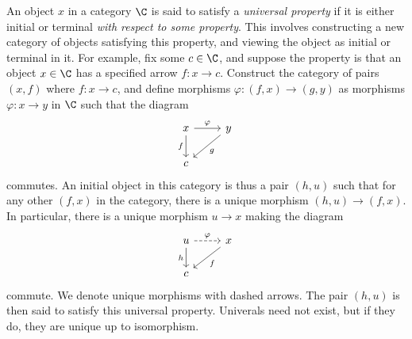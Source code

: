 \begin{terminology}\label{A.2.5}
    An object $x$ in a category $\C$ is said to satisfy a \emph{universal property} if it is either initial or terminal \emph{with respect to some property}. This involves constructing a new category of objects satisfying this property, and viewing the object as initial or terminal in it. For example, fix some $c\in\C$, and suppose the property is that an object $x\in\C$ has a specified arrow $f : x\to c$. Construct the category of pairs $(x,f)$ where $f : x\to c$, and define morphisms $\varphi : (f,x)\to (g,y)$ as morphisms $\varphi : x\to y$ in $\C$ such that the diagram
    \[\begin{tikzcd}
	x & y \\
	c
	\arrow["\varphi", from=1-1, to=1-2]
	\arrow["f"', from=1-1, to=2-1]
	\arrow["g", from=1-2, to=2-1]
\end{tikzcd}\]
    commutes. An initial object in this category is thus a pair $(h,u)$ such that for any other $(f,x)$ in the category, there is a unique morphism $(h,u)\rightarrow (f,x)$. In particular, there is a unique morphism $u\to x$ making the diagram
    \[\begin{tikzcd}
	u & x \\
	c
	\arrow["\varphi", dashed, from=1-1, to=1-2]
	\arrow["h"', from=1-1, to=2-1]
	\arrow["f", from=1-2, to=2-1]
\end{tikzcd}\]
    commute. We denote unique morphisms with dashed arrows. The pair $(h,u)$ is then said to satisfy this universal property. Univerals need not exist, but if they do, they are unique up to isomorphism.
\end{terminology}

